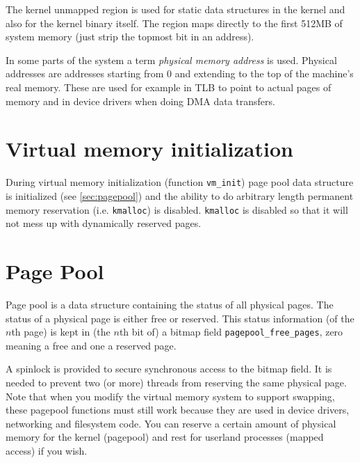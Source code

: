 \documentclass[twoside,a4paper]{report}
\begin{document}
The kernel unmapped region is used for static data structures in the
kernel and also for the kernel binary itself. The region maps directly to
the first 512MB of system memory (just strip the topmost bit in
an address).

In some parts of the system a term \emph{physical memory address}
 is used. Physical addresses are
addresses starting from 0 and extending to the top of the machine's
real memory. These are used for example in TLB to point to actual
pages of memory and in device drivers when doing DMA data transfers.

\section{Virtual memory initialization}

During virtual memory initialization (function
\texttt{vm\_init}) page pool data
structure is initialized (see \autoref{sec:pagepool}) and the
ability to do arbitrary length permanent memory reservation (i.e.
\texttt{kmalloc}) is disabled.
\texttt{kmalloc} is disabled so that it will not mess up with dynamically
reserved pages.

\section{Page Pool}
\label{sec:pagepool}


Page pool is a data structure containing the status of all physical
pages. The status of a physical page is either free or reserved. This
status information (of the $n$th page) is kept in (the $n$th bit of) a
bitmap field
\texttt{pagepool\_free\_pages},
zero meaning a free and one a reserved page.

A spinlock is provided to secure synchronous access to the bitmap
field. It is needed to prevent two (or more) threads from reserving
the same physical page. Note that when you modify the virtual memory
system to support swapping, these pagepool functions must still work
because they are used in device drivers, networking and filesystem
code. You can reserve a certain amount of physical memory for the kernel
(pagepool) and rest for userland processes (mapped access) if you wish.
\end{document}
